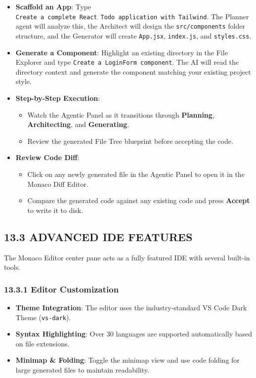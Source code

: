 \documentclass[
  12pt,
]{article}
\providecommand{\tightlist}{%
  \setlength{\itemsep}{0pt}\setlength{\parskip}{0pt}}
\begin{document}
\begin{itemize}
\tightlist
\item
  \textbf{Scaffold an App}: Type
  \texttt{Create\ a\ complete\ React\ Todo\ application\ with\ Tailwind}.
  The Planner agent will analyze this, the Architect will design the
  \texttt{src/components} folder structure, and the Generator will
  create \texttt{App.jsx}, \texttt{index.js}, and \texttt{styles.css}.
\item
  \textbf{Generate a Component}: Highlight an existing directory in the
  File Explorer and type \texttt{Create\ a\ LoginForm\ component}. The
  AI will read the directory context and generate the component matching
  your existing project style.
\item
  \textbf{Step-by-Step Execution}:

  \begin{itemize}
  \tightlist
  \item
    Watch the Agentic Panel as it transitions through \textbf{Planning},
    \textbf{Architecting}, and \textbf{Generating}.
  \item
    Review the generated File Tree blueprint before accepting the code.
  \end{itemize}
\item
  \textbf{Review Code Diff}:

  \begin{itemize}
  \tightlist
  \item
    Click on any newly generated file in the Agentic Panel to open it in
    the Monaco Diff Editor.
  \item
    Compare the generated code against any existing code and press
    \textbf{Accept} to write it to disk.
  \end{itemize}
\end{itemize}

\subsection{13.3 ADVANCED IDE FEATURES}\label{advanced-ide-features}

The Monaco Editor center pane acts as a fully featured IDE with several
built-in tools.

\subsubsection{13.3.1 Editor Customization}\label{editor-customization}

\begin{itemize}
\tightlist
\item
  \textbf{Theme Integration}: The editor uses the industry-standard VS
  Code Dark Theme (\texttt{vs-dark}).
\item
  \textbf{Syntax Highlighting}: Over 30 languages are supported
  automatically based on file extensions.
\item
  \textbf{Minimap \& Folding}: Toggle the minimap view and use code
  folding for large generated files to maintain readability.
\end{itemize}
\end{document}
